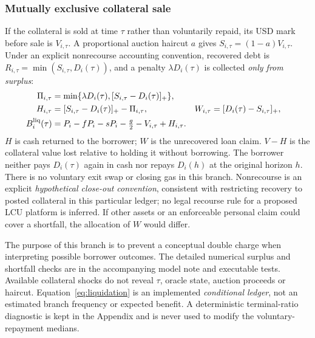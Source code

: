 \documentclass[sn-vancouver,Numbered]{sn-jnl}
\begin{document}
\subsubsection{Mutually exclusive collateral sale}
If the collateral is sold at time $\tau$ rather than voluntarily repaid, its USD mark before sale is $V_{i,\tau}$. A proportional auction haircut $a$ gives $S_{i,\tau}=(1-a)V_{i,\tau}$. Under an explicit nonrecourse accounting convention, recovered debt is $R_{i,\tau}=\min(S_{i,\tau},D_i(\tau))$, and a penalty $\lambda D_i(\tau)$ is collected \emph{only from surplus}:
\begin{align}
\Pi_{i,\tau}&=\min\{\lambda D_i(\tau),[S_{i,\tau}-D_i(\tau)]_+\},\\
H_{i,\tau}&=[S_{i,\tau}-D_i(\tau)]_+-\Pi_{i,\tau},&
W_{i,\tau}&=[D_i(\tau)-S_{i,\tau}]_+,\\
B_i^{\rm liq}(\tau)&=P_i-fP_i-sP_i-\tfrac{g}{2}
-V_{i,\tau}+H_{i,\tau}.
\label{eq:liquidation}
\end{align}
$H$ is cash returned to the borrower; $W$ is the unrecovered loan claim. $V-H$ is the collateral value lost relative to holding it without borrowing. The borrower neither pays $D_i(\tau)$ again in cash nor repays $D_i(h)$ at the original horizon $h$. There is no voluntary exit swap or closing gas in this branch. Nonrecourse is an explicit \emph{hypothetical close-out convention}, consistent with restricting recovery to posted collateral in this particular ledger; no legal recourse rule for a proposed LCU platform is inferred. If other assets or an enforceable personal claim could cover a shortfall, the allocation of $W$ would differ.

The purpose of this branch is to prevent a conceptual double charge when interpreting possible borrower outcomes. The detailed numerical surplus and shortfall checks are in the accompanying model note and executable tests. Available collateral shocks do not reveal $\tau$, oracle state, auction proceeds or haircut. Equation~\eqref{eq:liquidation} is an implemented \emph{conditional ledger}, not an estimated branch frequency or expected benefit. A deterministic terminal-ratio diagnostic is kept in the Appendix and is never used to modify the voluntary-repayment medians.
\end{document}
